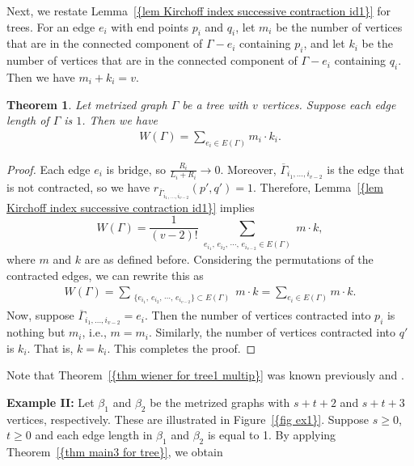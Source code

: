 \documentclass[12pt]{amsart}
\newtheorem{theorem}{Theorem}[section]
\theoremstyle{example}
\theoremstyle{definition}
\theoremstyle{notation}
\begin{document}
Next, we restate {Lemma~\ref{{lem Kirchoff index successive contraction id1}}} for trees. For an edge $e_i$ with end points ${p_{i}}$ and ${q_{i}}$, let
$m_i$ be the number of vertices that are in the connected component of ${\Gamma}-e_i$ containing ${p_{i}}$, and let
$k_i$ be the number of vertices that are in the connected component of ${\Gamma}-e_i$ containing ${q_{i}}$. Then we have $m_i+k_i=v$.
\begin{theorem}\label{thm wiener for tree1 multip}
Let metrized graph ${\Gamma}$ be a tree with $v$ vertices. Suppose each edge length of ${\Gamma}$ is $1$. Then we have
\begin{equation*}
\begin{split}
W({\Gamma})= \sum_{e_i \in {E({\Gamma})}} m_i \cdot k_i.
\end{split}
\end{equation*}
\end{theorem}
\begin{proof}
Each edge $e_i$ is bridge, so $\frac{R_{i}}{{L_{i}}+{R_{i}}} \longrightarrow 0$. Moreover,
${{\overline{\Gamma}}}_{i_1,\dots, i_{v-2}}$ is the edge that is not contracted, so we have $r_{{{\overline{\Gamma}}}_{i_1,\dots, i_{v-2}}}(p',q')=1$.
Therefore, {Lemma~\ref{{lem Kirchoff index successive contraction id1}}} implies
$$W({\Gamma})=\frac{1}{(v-2)!}\sum_{\substack{e_{i_1}, \, e_{i_2}, \, \cdots, \,  e_{i_{v-2}} \in {E({\Gamma})}}} m \cdot k,$$
where $m$ and $k$ are as defined before. Considering the permutations of the contracted edges, we can rewrite this as
\begin{equation*}
\begin{split}
W({\Gamma})=\sum_{\substack{ \{ e_{i_1}, \, e_{i_2}, \, \cdots, \,  e_{i_{v-2}} \}  \subset {E({\Gamma})}}} m \cdot k
= \sum_{e_i \in {E({\Gamma})}} m \cdot k.
\end{split}
\end{equation*}
Now, suppose ${{\overline{\Gamma}}}_{i_1,\dots, i_{v-2}}=e_i$. Then the number of vertices contracted into ${p_{i}}$ is nothing but $m_i$, i.e., $m=m_i$. Similarly, the number of vertices contracted into $q'$ is $k_i$. That is, $k=k_i$.
This completes the proof.
\end{proof}
Note that {Theorem~\ref{{thm wiener for tree1 multip}}} was known previously \cite[page 218]{DEG} and \cite{HW}.

\textbf{Example II:}
Let $\beta_1$ and $\beta_2$  be the metrized graphs with $s+t+2$ and $s+t+3$ vertices, respectively. These are illustrated in {Figure~\ref{{fig ex1}}}. Suppose $s \geq 0$, $t \geq 0$ and each edge length in $\beta_1$ and $\beta_2$ is equal to 1. By applying {Theorem~\ref{{thm main3 for tree}}}, we obtain
\end{document}

